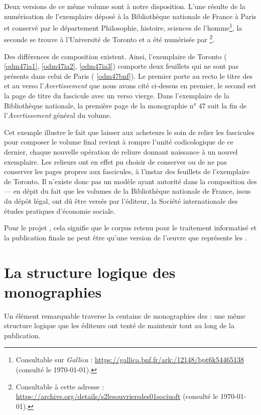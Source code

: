 Deux versions de ce même volume sont à notre disposition. L'une résulte de la numérisation de l'exemplaire déposé à la Bibliothèque nationale de France à Paris et conservé par le département Philosophie, histoire, sciences de l'homme\footnote{Consultable sur \textit{Gallica} : \url{https://gallica.bnf.fr/ark:/12148/bpt6k54465138} (consulté le \today).}, la seconde se trouve à l'Université de Toronto et a été numérisée par \ia\footnote{Consultable à cette adresse : \url{https://archive.org/details/s2lesouvriersdes01sociuoft} (consulté le \today).}.

Des différences de composition existent. Ainsi, l'exemplaire de Toronto (\fig{} \ref{odm47ia1}, \ref{odm47ia2}, \ref{odm47ia3}) comporte deux feuillets qui ne sont pas présents dans celui de Paris (\fig{} \ref{odm47bnf}). Le premier porte au recto le titre des \odm{} et au verso l'\textit{Avertissement} que nous avons cité ci-dessus en premier, le second est la page de titre du fascicule avec un verso vierge. Dans l'exemplaire de la Bibliothèque nationale, la première page de la monographie n° 47 suit la fin de l'\textit{Avertissement} général du volume.

Cet exemple illustre le fait que laisser aux acheteurs le soin de relier les fascicules pour composer le volume final revient à rompre l'unité codicologique de ce dernier, chaque nouvelle opération de reliure donnant naissance à un nouvel exemplaire. Les relieurs ont en effet pu choisir de conserver ou de ne pas conserver les pages propres aux fascicules, à l'instar des feuillets de l'exemplaire de Toronto. Il n'existe donc pas un modèle ayant autorité dans la composition des \odm{} --- en dépit du fait que les volumes de la Bibliothèque nationale de France, issus du dépôt légal, ont dû être versés par l'éditeur, \cad{} la Société internationale des études pratiques d'économie sociale.

Pour le projet \timeus{}, cela signifie que le corpus retenu pour le traitement informatisé et la publication finale ne peut être qu'une version de l'\oe{}uvre que représente les \odm.

\section{La structure logique des monographies}

Un élément remarquable traverse la centaine de monographies des \odm{} : une même structure logique que les éditeurs ont tenté de maintenir tout au long de la publication.

